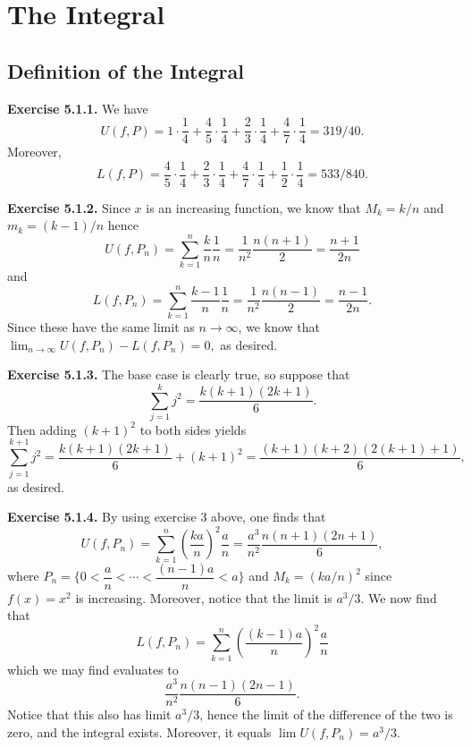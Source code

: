 \documentclass[12pt]{book}
\newenvironment{exercise}[2][Exercise]{\begin{trivlist}
\item[\hskip \labelsep {\bfseries #1}\hskip \labelsep {\bfseries #2.}]}{\end{trivlist}}
\newcommand{\prb}[1]{\textbf{Exercise #1.}}
\begin{document}
\begin{exercise}{4.4.16}
\end{exercise}



\chapter{The Integral}
\section{Definition of the Integral}

\prb{5.1.1} We have $$U(f, P) = 1 \cdot \dfrac{1}{4} + \dfrac{4}{5} \cdot \dfrac{1}{4} + \dfrac{2}{3} \cdot \dfrac{1}{4} + \dfrac{4}{7} \cdot \dfrac{1}{4} = 319/40.$$ Moreover, $$L(f,P) = \dfrac{4}{5} \cdot \dfrac{1}{4} + \dfrac{2}{3} \cdot \dfrac{1}{4} + \dfrac{4}{7} \cdot \dfrac{1}{4} + \dfrac{1}{2} \cdot \dfrac{1}{4} = 533/840.$$

\prb{5.1.2} Since $x$ is an increasing function, we know that $M_k = k/n$ and $m_k = (k-1)/n$ hence $$U(f, P_n) = \displaystyle \sum_{k=1}^n \dfrac{k}{n} \dfrac{1}{n} = \dfrac{1}{n^2} \dfrac{n(n+1)}{2} = \dfrac{n+1}{2n}$$ and $$L(f, P_n) = \displaystyle \sum_{k=1}^n \dfrac{k-1}{n} \dfrac{1}{n} = \dfrac{1}{n^2} \dfrac{n(n-1)}{2} = \dfrac{n-1}{2n}.$$ Since these have the same limit as $n \rightarrow \infty$, we know that $\lim_{n \rightarrow \infty} U(f, P_n) - L(f, P_n) = 0,$ as desired.

\prb{5.1.3} The base case is clearly true, so suppose that $$\displaystyle \sum_{j=1}^k j^2 = \dfrac{k(k+1)(2k+1)}{6}.$$ Then adding $(k+1)^2$ to both sides yields $$\displaystyle \sum_{j=1}^{k+1} j^2 = \dfrac{k(k+1)(2k+1)}{6} + (k+1)^2 = \dfrac{(k+1)(k+2)(2(k+1)+1)}{6},$$ as desired.

\prb{5.1.4} By using exercise 3 above, one finds that $$U(f, P_n) = \sum_{k=1}^n \left(\dfrac{ka}{n}\right)^2 \dfrac{a}{n} = \dfrac{a^3}{n^2} \dfrac{n(n+1)(2n+1)}{6},$$ where $P_n = \{ 0 < \dfrac{a}{n} < \cdots < \dfrac{(n-1)a}{n} < a\}$ and $M_k = (ka/n)^2$ since $f(x) = x^2$ is increasing. Moreover, notice that the limit is $a^3/3$. We now find that $$L(f, P_n) = \sum_{k=1}^n \left(\dfrac{(k-1)a}{n}\right)^2 \dfrac{a}{n}$$ which we may find evaluates to $$\dfrac{a^3}{n^2} \dfrac{n(n-1)(2n-1)}{6}.$$ Notice that this also has limit $a^3/3$, hence the limit of the difference of the two is zero, and the integral exists. Moreover, it equals $\lim U(f, P_n) = a^3/3.$
\end{document}
